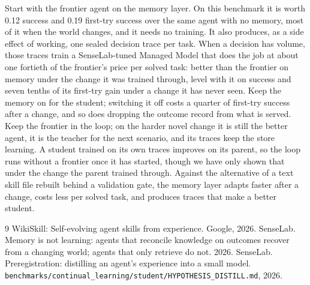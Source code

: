 \documentclass[11pt]{article}
\begin{document}
Start with the frontier agent on the memory layer. On this benchmark it is worth 0.12
success and 0.19 first-try success over the same agent with no memory, most of it when the
world changes, and it needs no training. It also produces, as a side effect of working, one
sealed decision trace per task. When a decision has volume, those traces train a
SenseLab-tuned Managed Model that does the job at about one fortieth of the frontier's price
per solved task: better than the frontier on memory under the change it was trained through,
level with it on success and seven tenths of its first-try gain under a change it has never
seen. Keep the memory on for the student; switching it off costs a quarter of first-try
success after a change, and so does dropping the outcome record from what is served. Keep the
frontier in the loop; on the harder novel change it is still the better agent, it is the
teacher for the next scenario, and its traces keep the store learning. A student trained on
its own traces improves on its parent, so the loop runs without a frontier once it has
started, though we have only shown that under the change the parent trained through.
Against the alternative of a text skill file rebuilt behind a validation gate, the memory
layer adapts faster after a change, costs less per solved task, and produces traces that make
a better student.

\begin{thebibliography}{9}
 WikiSkill: Self-evolving agent skills from experience. Google, 2026.
 SenseLab. Memory is not learning: agents that reconcile
knowledge on outcomes recover from a changing world; agents that only retrieve do not.
2026.
 SenseLab. Preregistration: distilling an agent's experience into a
small model. \texttt{benchmarks/continual\_learning/student/HYPOTHESIS\_DISTILL.md}, 2026.
\end{thebibliography}
\end{document}
